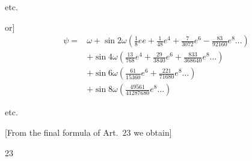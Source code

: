{\centering etc.\par}
or]
\[
\begin{aligned}
\psi={}&\omega+\sin2\omega(\tfrac18ee+\tfrac1{48}e^4+\tfrac7{3072}e^6-\tfrac{83}{92160}e^8\ldots)\\
&+\sin4\omega(\tfrac{13}{768}e^4+\tfrac{29}{3840}e^6+\tfrac{833}{368640}e^8\ldots)\\
&+\sin6\omega(\tfrac{61}{15360}e^6+\tfrac{221}{71680}e^8\ldots)\\
&+\sin8\omega(\tfrac{49561}{41287680}e^8\ldots)
\end{aligned}
\]
{\centering etc.\par}
[From the final formula of Art.~23 we obtain]
\par{}\hfill{\small23}\hspace*{.12\linewidth}\par

